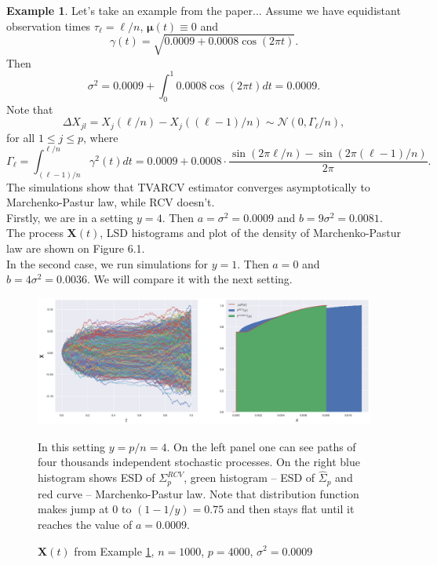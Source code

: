 \documentclass[a4paper,11pt]{book}
\theoremstyle{plain}
\theoremstyle{definition}
\newtheorem{exmp}[thm]{Example}
\begin{document}
    \begin{exmp} \label{SimCos}
    	Let's take an example from the paper... Assume we have equidistant observation times $\tau_{\ell} = \ell / n$, $\boldsymbol{\mu}(t) \equiv 0$ and
    	\[
    	\gamma(t) = \sqrt{0.0009 + 0.0008 \cos(2 \pi t)}.
    	\]
    	Then
    	\[ \sigma^2 = 0.0009 + \int_{0}^{1}0.0008 \cos(2 \pi t) dt = 0.0009. \]
    	Note that
    	\[ \Delta X_{jl} = X_j(\ell/n) - X_j((\ell-1)/n) \sim \mathcal{N}(0, \Gamma_\ell / n ), \]
    	for all $1 \leq j \leq p$, where
    	\[ \Gamma_\ell = \int_{(\ell-1)/n}^{\ell / n} \gamma^2(t)dt = 0.0009 + 0.0008 \cdot \frac{ \sin(2\pi \ell / n )-\sin(2\pi (\ell-1) / n ) }{2\pi}. \]
    	The simulations show that TVARCV estimator converges asymptotically to Marchenko-Pastur law, while RCV doesn't. \\
    	Firstly, we are in a setting $y = 4$. Then $a = \sigma^2 = 0.0009$ and $b = 9\sigma^2 = 0.0081$. The process $\mathbf{X}(t)$, LSD histograms and plot of the density of Marchenko-Pastur law are shown on Figure 6.1. \\
    	In the second case, we run simulations for $y = 1$. Then $a = 0$ and $b = 4\sigma^2 = 0.0036$. We will compare it with the next setting.
    \end{exmp}
    
    \begin{figure}[ht]
    	\begin{center} \centering
    		\includegraphics[scale=0.4]{XCos2}
    		\caption{ $\mathbf{X}(t)$ from Example \ref{SimCos}, $n = 1000$, $p=4000$, $\sigma^2 = 0.0009$ }
    		\smallskip
    		\small
    		In this setting $y = p/n = 4$. On the left panel one can see paths of four thousands independent stochastic processes. On the right blue histogram shows ESD of $\Sigma_p^{RCV}$, green histogram -- ESD of $\widehat{\Sigma}_p$ and red curve -- Marchenko-Pastur law. Note that distribution function makes jump at $0$ to $(1-1/y) = 0.75$ and then stays flat until it reaches the value of $a = 0.0009$.
    	\end{center}
    \end{figure}
    
\end{document}
